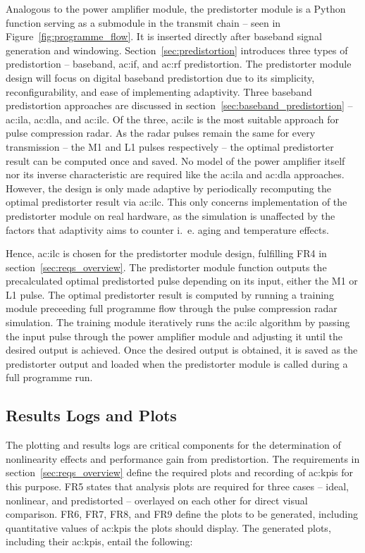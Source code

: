 Analogous to the power amplifier module, the predistorter module is a Python function serving as a submodule in the transmit chain -- seen in Figure~\ref{fig:programme_flow}. It is inserted directly after baseband signal generation and windowing. Section~\ref{sec:predistortion} introduces three types of predistortion -- baseband, \gls{ac:if}, and \gls{ac:rf} predistortion. The predistorter module design will focus on digital baseband predistortion due to its simplicity, reconfigurability, and ease of implementing adaptivity. Three baseband predistortion approaches are discussed in section~\ref{sec:baseband_predistortion} -- \gls{ac:ila}, \gls{ac:dla}, and \gls{ac:ilc}. Of the three, \gls{ac:ilc} is the most suitable approach for pulse compression radar. As the radar pulses remain the same for every transmission -- the M1 and L1 pulses respectively -- the optimal predistorter result can be computed once and saved. No model of the power amplifier itself nor its inverse characteristic are required like the \gls{ac:ila} and \gls{ac:dla} approaches. However, the design is only made adaptive by periodically recomputing the optimal predistorter result via \gls{ac:ilc}. This only concerns implementation of the predistorter module on real hardware, as the simulation is unaffected by the factors that adaptivity aims to counter i.~e. aging and temperature effects.

Hence, \gls{ac:ilc} is chosen for the predistorter module design, fulfilling FR4 in section~\ref{sec:reqs_overview}. The predistorter module function outputs the precalculated optimal predistorted pulse depending on its input, either the M1 or L1 pulse. The optimal predistorter result is computed by running a training module preceeding full programme flow through the pulse compression radar simulation. The training module iteratively runs the \gls{ac:ilc} algorithm by passing the input pulse through the power amplifier module and adjusting it until the desired output is achieved. Once the desired output is obtained, it is saved as the predistorter output and loaded when the predistorter module is called during a full programme run.   

\subsection{Results Logs and Plots}\label{sec:results_logs_and_plots}

The plotting and results logs are critical components for the determination of nonlinearity effects and performance gain from predistortion. The requirements in section~\ref{sec:reqs_overview} define the required plots and recording of \glspl{ac:kpi} for this purpose. FR5 states that analysis plots are required for three cases -- ideal, nonlinear, and predistorted -- overlayed on each other for direct visual comparison. FR6, FR7, FR8, and FR9 define the plots to be generated, including quantitative values of \glspl{ac:kpi} the plots should display. The generated plots, including their \glspl{ac:kpi}, entail the following:


